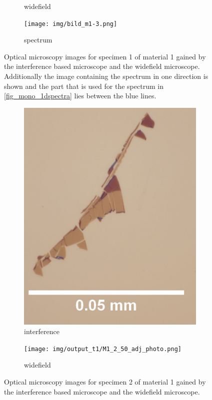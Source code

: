 \begin{figure}[!ht]
\begin{subfigure}{0.47\textwidth}
        \caption{widefield}
	      \label{fig_mono_spec1_wide}
    \end{subfigure}
    \begin{subfigure}{0.7\textwidth}
        \centering
        \texttt{[image: img/bild\_m1-3.png]}
        \caption{spectrum}
	      \label{fig_mono_spec1_spec}
    \end{subfigure}
    \caption{Optical microscopy images for specimen 1 of material 1 gained by the interference based microscope and the widefield microscope. Additionally the image containing the spectrum in one direction is shown and the part that is used for the spectrum in \cref{fig_mono_1dspectra} lies between the blue lines.}
	\label{fig_mono_spec1} %
\end{figure}

\begin{figure}[!ht]
    \centering
    \begin{subfigure}{0.47\textwidth}
        \centering
        \includegraphics[width=1.0\textwidth]{img/output_t1/M1_2_100_adj}
        \caption{interference}
	      \label{fig_mono_spec2_int}
    \end{subfigure}
    \hfill
    \begin{subfigure}{0.47\textwidth}
        \centering
        \texttt{[image: img/output\_t1/M1\_2\_50\_adj\_photo.png]}
        \caption{widefield}
	      \label{fig_mono_spec2_wide}
    \end{subfigure}
    \caption{Optical microscopy images for specimen 2 of material 1 gained by the interference based microscope and the widefield microscope.}
	\label{fig_mono_spec2} %
\end{figure}

